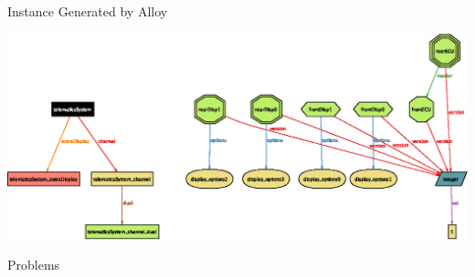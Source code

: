 \documentclass[table,15pt,t]{beamer}
\newcommand{\vmiddle}[1]{
  \vspace{\stretch{1}}
  #1
  \vspace{\stretch{1}}
}
\newcommand{\interframe}[1]{
\begin{frame}{}
\vmiddle{\hmiddle{\Huge #1}}
\end{frame}
}
\newcommand{\hmiddle}[1]{
  \begin{center}#1\end{center}
}
\newcounter{i}
\begin{document}
\begin{frame}{Instance Generated by Alloy}
  \hmiddle{\includegraphics[width=1\textwidth]{figs/tele}}
\end{frame}

\interframe{Problems}
\end{document}
